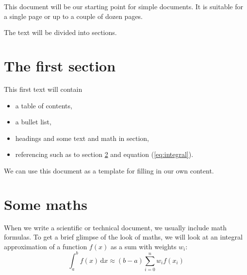 \documentclass[paper=a4,oneside,fontsize=12pt,parskip=full]{scrartcl}
\begin{document}
\tableofcontents
{}
This document will be our starting point for simple documents. It is suitable for a single page or up to a couple of dozen pages.

The text will be divided into sections.
\section{The first section}
This first text will contain

\begin{itemize} %
  \item a table of contents,
  \item a bullet list,
  \item headings and some text and math in section,
  \item referencing such as to section \ref{sec:maths} and equation (\ref{eq:integral}).
\end{itemize}
We can use this document as a template for filling in our own content.
\section{Some maths}
\label{sec:maths}
When we write a scientific or technical document, we usually include math formulas. To get a brief glimpse of the look of maths, we will look at an integral approximation of a function $f(x)$ as a sum with weights $w_i$:
\begin{equation}
  \label{eq:integral}
  \int_a^b f(x)\,\mathrm{d}x \approx (b-a)
  \sum_{i=0}^n w_i f(x_i)
\end{equation}
\end{document}
